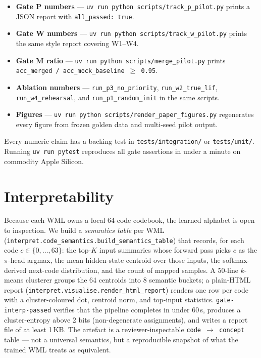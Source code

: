 \documentclass[10pt,twocolumn]{article}
\begin{document}
\begin{itemize}
  \item \textbf{Gate P numbers} — \texttt{uv run python scripts/track\_p\_pilot.py} prints a JSON report with \texttt{all\_passed: true}.
  \item \textbf{Gate W numbers} — \texttt{uv run python scripts/track\_w\_pilot.py} prints the same style report covering W1--W4.
  \item \textbf{Gate M ratio} — \texttt{uv run python scripts/merge\_pilot.py} prints \texttt{acc\_merged / acc\_mock\_baseline $\geq$ 0.95}.
  \item \textbf{Ablation numbers} — \texttt{run\_p3\_no\_priority}, \texttt{run\_w2\_true\_lif}, \texttt{run\_w4\_rehearsal}, and \texttt{run\_p1\_random\_init} in the same scripts.
  \item \textbf{Figures} — \texttt{uv run python scripts/render\_paper\_figures.py} regenerates every figure from frozen golden data and multi-seed pilot output.
\end{itemize}

Every numeric claim has a backing test in \texttt{tests/integration/} or \texttt{tests/unit/}. Running \texttt{uv run pytest} reproduces all gate assertions in under a minute on commodity Apple Silicon.

\section{Interpretability}
\label{sec:interp}

Because each WML owns a local 64-code codebook, the learned alphabet
is open to inspection. We build a \emph{semantics table} per WML
(\texttt{interpret.code\_semantics.build\_semantics\_table}) that
records, for each code $c \in \{0, \dots, 63\}$: the top-$K$ input
summaries whose forward pass picks $c$ as the $\pi$-head argmax, the
mean hidden-state centroid over those inputs, the softmax-derived
next-code distribution, and the count of mapped samples. A $50$-line
$k$-means clusterer groups the 64 centroids into 8 semantic buckets;
a plain-HTML report (\texttt{interpret.visualise.render\_html\_report})
renders one row per code with a cluster-coloured dot, centroid norm,
and top-input statistics. \texttt{gate-interp-passed} verifies that
the pipeline completes in under 60\,s, produces a cluster-entropy
above 2 bits (non-degenerate assignments), and writes a report file
of at least 1\,KB. The artefact is a reviewer-inspectable
\texttt{code\,$\to$\,concept} table --- not a universal semantics, but
a reproducible snapshot of what the trained WML treats as equivalent.
\end{document}
